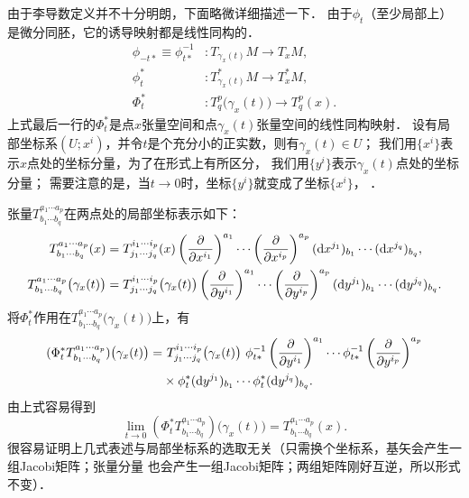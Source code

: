 由于李导数定义并不十分明朗，下面略微详细描述一下．
由于$\phi_t$（至少局部上）是微分同胚，它的诱导映射都是线性同构的．
\begin{align}
    \phi_{-t*} \equiv \phi_{t*} ^{-1} &: T_{\gamma_x(t)}M \to T_x M , \\
    \phi_{t}^{*} &: T_{\gamma_x(t)}^{*}M \to T_x^{*} M , \\
    \Phi_{t}^{*} &: T_q^p\bigl({\gamma_x(t)}\bigr) \to T_q^p(x) .
\end{align}
上式最后一行的$\Phi_t^{*}$是点$x$张量空间和点$\gamma_x(t)$张量空间的线性同构映射．
设有局部坐标系$(U;x^i)$，并令$t$是个充分小的正实数，则有$\gamma_x(t)\in U$；
我们用$\{x^i\}$表示$x$点处的坐标分量，为了在形式上有所区分，
我们用$\{y^i\}$表示$\gamma_x(t)$点处的坐标分量；
需要注意的是，当$t\to 0$时，坐标$\{y^i\}$就变成了坐标$\{x^i\}$，
．

张量$T^{a_1 \cdots a_p}_{b_1\cdots b_q} $在两点处的局部坐标表示如下：
\begin{align*}
    T^{a_1 \cdots a_p}_{b_1\cdots b_q}(x) & = T^{i_1 \cdots i_p}_{j_1\cdots j_q} (x)
    \left(\frac{\partial }{\partial x^{i_1}}\right)^{a_1} \cdots 
    \left(\frac{\partial }{\partial x^{i_p}}\right)^{a_p} 
    ({\rm d}x^{j_1})_{b_1} \cdots  ({\rm d}x^{j_q})_{b_q}    ,\\
    T^{a_1 \cdots a_p}_{b_1\cdots b_q}\bigl(\gamma_x(t)\bigr) 
    & = T^{i_1 \cdots i_p}_{j_1\cdots j_q}\bigl(\gamma_x(t)\bigr)
    \left(\frac{\partial }{\partial y^{i_1}}\right)^{a_1} \cdots 
    \left(\frac{\partial }{\partial y^{i_p}}\right)^{a_p} 
    ({\rm d}y^{j_1})_{b_1} \cdots  ({\rm d}y^{j_q})_{b_q}    .
\end{align*}
将$\Phi_t^*$作用在$T^{a_1 \cdots a_p}_{b_1\cdots b_q}\bigl(\gamma_x(t)\bigr)$上，有
\begin{equation}\label{chdm:eqn_tmp501}
\begin{aligned}
    (\Phi_t^* T^{a_1 \cdots a_p}_{b_1\cdots b_q})\bigl(\gamma_x(t)\bigr) 
     =& \ T^{i_1 \cdots i_p}_{j_1\cdots j_q}\bigl(\gamma_x(t)\bigr) \ 
    \phi_{t*} ^{-1}  \left(\frac{\partial }{\partial y^{i_1}}\right)^{a_1} \cdots 
    \phi_{t*} ^{-1} \left(\frac{\partial }{\partial y^{i_p}}\right)^{a_p} \\
    & \times \phi_{t}^{*}({\rm d}y^{j_1})_{b_1} \cdots \phi_{t}^{*} ({\rm d}y^{j_q})_{b_q}  .
\end{aligned}
\end{equation}
由上式容易得到
\begin{equation}
    \lim_{t\to 0}(\Phi_t^* T^{a_1 \cdots a_p}_{b_1\cdots b_q})\bigl(\gamma_x(t)\bigr)
    =T^{a_1 \cdots a_p}_{b_1\cdots b_q}(x).
\end{equation}
很容易证明上几式表述与局部坐标系的选取无关（只需换个坐标系，基矢会产生一组Jacobi矩阵；张量分量
也会产生一组Jacobi矩阵；两组矩阵刚好互逆，所以形式不变）．

